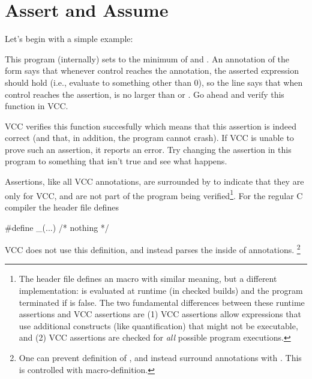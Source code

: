 \section{Assert and Assume}
Let's begin with a simple example:

This program (internally) sets  to the minimum of  and
. An annotation of the form  says that whenever
control reaches the annotation, the asserted expression should hold (i.e.,
evaluate to something other than 0), so the line 
 says that when control reaches the
assertion,  is no larger than  or . Go ahead and
verify this function in VCC. 

VCC verifies this function succesfully which means that this assertion
is indeed correct (and that, in addition, the program cannot
crash). If VCC is unable to prove such an assertion, it reports an
error. Try changing the assertion in this program to something that
isn't true and see what happens.

Assertions, like all VCC annotations, 
are surrounded by  to indicate that they are
only for VCC, and are not part of the program being verified\footnote{
  The  header file defines an  macro
  with similar meaning, but a different implementation: 
   is evaluated at runtime (in checked builds) and
  the program terminated if  is false.  The two fundamental
  differences between these runtime assertions and VCC assertions are
  (1) VCC assertions allow expressions that use additional constructs
  (like quantification) that might not be executable, and (2) VCC
  assertions are checked for \emph{all} possible program executions.}.  
For the regular C compiler the  header file defines
\begin{VCC}
#define _(...) /* nothing */
\end{VCC}
VCC does not use this definition, and instead parses the inside of 
annotations.%
\footnote{
  One can prevent definition of \vcc{_}, and instead surround annotations with
  .
  This is controlled with  macro-definition.}

